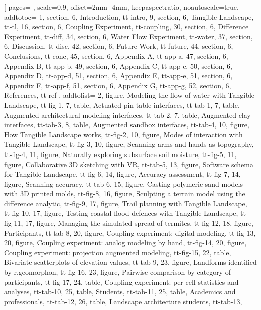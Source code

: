 \documentclass[11pt,          %
               phd,           %
               onehalfspacing %
               ]{ncsuthesis}
\begin{document}

%
[
pages={-},
scale={0.9},
offset={2mm -4mm},
keepaspectratio,
noautoscale={true},
addtotoc={
	1, section, 6, Introduction, tt-intro,
	9, section, 6, Tangible Landscape, tt-tl,
	16, section, 6, Coupling Experiment, tt-coupling,
	30, section, 6, Difference Experiment, tt-diff,
	34, section, 6, Water Flow Experiment, tt-water,
	37, section, 6, Discussion, tt-disc,
	42, section, 6, Future Work, tt-future,
	44, section, 6, Conclusions, tt-conc,
	45, section, 6, Appendix A, tt-app-a,
	47, section, 6, Appendix B, tt-app-b,
	49, section, 6, Appendix C, tt-app-c,
	50, section, 6, Appendix D, tt-app-d,
	51, section, 6, Appendix E, tt-app-e,
	51, section, 6, Appendix F, tt-app-f,
	51, section, 6, Appendix G, tt-app-g,
	52, section, 6, References, tt-ref
	},
addtolist={
	2, figure, Modeling the flow of water with Tangible Landscape, tt-fig-1,
	7, table, Actuated pin table interfaces, tt-tab-1,
	7, table, Augmented architectural modeling interfaces, tt-tab-2,
	7, table, Augmented clay interfaces, tt-tab-3,
	8, table, Augmented sandbox interfaces, tt-tab-4,
	10, figure, How Tangible Landscape works, tt-fig-2,
	10, figure, Modes of interaction with Tangible Landscape, tt-fig-3,
	10, figure, Scanning arms and hands as topography, tt-fig-4, 
	11, figure, Naturally exploring subsurface soil moisture, tt-fig-5,
	11, figure, Collaborative 3D sketching with VR, tt-tab-5,
	13, figure, Software schema for Tangible Landscape, tt-fig-6,
	14, figure, Accuracy assessment, tt-fig-7,
	14, figure, Scanning accuracy, tt-tab-6,
	15, figure, Casting polymeric sand models with 3D printed molds, tt-fig-8,
	16, figure, Sculpting a terrain model using the difference analytic, tt-fig-9,
	17, figure, Trail planning with Tangible Landscape, tt-fig-10,
	17, figure, Testing coastal flood defences with Tangible Landscape, tt-fig-11,
	17, figure, Managing the simulated spread of termites, tt-fig-12,
	18, figure, Participants, tt-tab-8,
	20, figure, {Coupling experiment: digital modeling}, tt-fig-13,
	20, figure, {Coupling experiment: analog modeling by hand}, tt-fig-14,
	20, figure, {Coupling experiment: projection augmented modeling}, tt-fig-15,
	22, table, Bivariate scatterplots of elevation values, tt-tab-9,
	23, figure, {Landforms identified by r.geomorphon}, tt-fig-16,
	23, figure, {Pairwise comparison by category of participants}, tt-fig-17,
	24, table, {Coupling experiment: per-cell statistics and analyses}, tt-tab-10,
	25, table, {Students}, tt-tab-11,
	25, table, {Academics and professionals}, tt-tab-12,
	26, table, {Landscape architecture students}, tt-tab-13,
}
\end{document}
